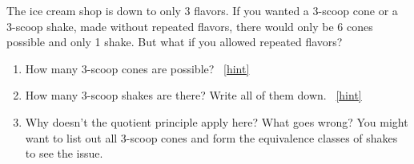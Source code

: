 \documentclass{book}
\begin{document}
\setcounter{project}{119}
\addtocounter{project}{-1}
\begin{activity}[]\label{activity-112}
\hypertarget{p-846}{}%
The ice cream shop is down to only 3 flavors.  If you wanted a 3-scoop cone or a 3-scoop shake, made without repeated flavors, there would only be 6 cones possible and only 1 shake.  But what if you allowed repeated flavors?%
\begin{enumerate}[font=\bfseries,label=(\alph*),ref=\alph*]
\item\label{task-153} \hypertarget{p-847}{}%
How many 3-scoop cones are possible?%
~\hfill{\tiny\hyperlink{a-119.a}{[hint]}\hypertarget{q-119.a}{}}\item\label{task-154} \hypertarget{p-849}{}%
How many 3-scoop shakes are there?  Write all of them down.%
~\hfill{\tiny\hyperlink{a-119.b}{[hint]}\hypertarget{q-119.b}{}}\item\label{task-155} \hypertarget{p-851}{}%
Why doesn't the quotient principle apply here?  What goes wrong?  You might want to list out all 3-scoop cones and form the equivalence classes of shakes to see the issue.%
\end{enumerate}
\end{activity}
\end{document}
